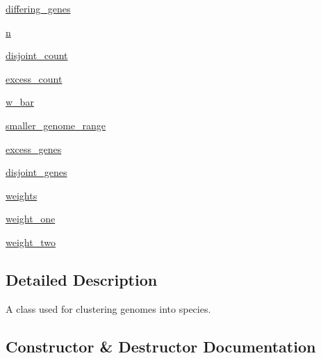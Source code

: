 \begin{DoxyCompactItemize}
\item 
\hyperlink{classNEAT__PyGenetics_1_1NEAT_1_1Analyst_1_1GenomeClusterer_1_1GenomeClusterer_a7b7e2e57ffced7bd6a6c884aa20f313a}{differing\+\_\+genes}
\item 
\hyperlink{classNEAT__PyGenetics_1_1NEAT_1_1Analyst_1_1GenomeClusterer_1_1GenomeClusterer_aed8ff1fe75594eae5a5422965cca13b5}{n}
\item 
\hyperlink{classNEAT__PyGenetics_1_1NEAT_1_1Analyst_1_1GenomeClusterer_1_1GenomeClusterer_abc33fd75cd1bbcb72c3bfea41db56b63}{disjoint\+\_\+count}
\item 
\hyperlink{classNEAT__PyGenetics_1_1NEAT_1_1Analyst_1_1GenomeClusterer_1_1GenomeClusterer_a0e1ff1aa859082568b6b5efeeb029234}{excess\+\_\+count}
\item 
\hyperlink{classNEAT__PyGenetics_1_1NEAT_1_1Analyst_1_1GenomeClusterer_1_1GenomeClusterer_adf2a23e3ff4eca53b7b4834cd9b51275}{w\+\_\+bar}
\item 
\hyperlink{classNEAT__PyGenetics_1_1NEAT_1_1Analyst_1_1GenomeClusterer_1_1GenomeClusterer_a402e6e20884053cc0ae8f04f86734091}{smaller\+\_\+genome\+\_\+range}
\item 
\hyperlink{classNEAT__PyGenetics_1_1NEAT_1_1Analyst_1_1GenomeClusterer_1_1GenomeClusterer_a4fdea1cdff3d733af9de249641892695}{excess\+\_\+genes}
\item 
\hyperlink{classNEAT__PyGenetics_1_1NEAT_1_1Analyst_1_1GenomeClusterer_1_1GenomeClusterer_a1aed67ecb6dba5bad3cf73de3b756b91}{disjoint\+\_\+genes}
\item 
\hyperlink{classNEAT__PyGenetics_1_1NEAT_1_1Analyst_1_1GenomeClusterer_1_1GenomeClusterer_aff7fba61d7cd8eeeed9149ed48211699}{weights}
\item 
\hyperlink{classNEAT__PyGenetics_1_1NEAT_1_1Analyst_1_1GenomeClusterer_1_1GenomeClusterer_ac1f8f1740d1a6663cc8fb29fe29f3c35}{weight\+\_\+one}
\item 
\hyperlink{classNEAT__PyGenetics_1_1NEAT_1_1Analyst_1_1GenomeClusterer_1_1GenomeClusterer_a2541d20300efb0cff96a18abb6a85d81}{weight\+\_\+two}
\end{DoxyCompactItemize}


\subsection{Detailed Description}
A class used for clustering genomes into species. 

\subsection{Constructor \& Destructor Documentation}
